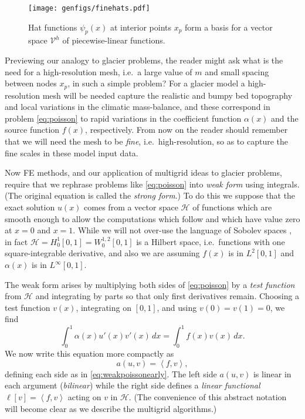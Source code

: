 \documentclass[letterpaper,final,12pt,reqno]{amsart}
\theoremstyle{claim}
\newcommand{\ip}[2]{\left<#1,#2\right>}
\numberwithin{equation}{section}
\numberwithin{figure}{section}
\numberwithin{table}{section}
\numberwithin{theorem}{section}
\begin{document}
\begin{figure}
\texttt{[image: genfigs/finehats.pdf]}
\caption{Hat functions $\psi_p(x)$ at interior points $x_p$ form a basis for a vector space $\mathcal{V}^h$ of piecewise-linear functions.}
\label{fig:finehats}
\end{figure}

Previewing our analogy to glacier problems, the reader might ask what is the need for a high-resolution mesh, i.e.~a large value of $m$ and small spacing between nodes $x_p$, in such a simple problem?  For a glacier model a high-resolution mesh will be needed capture the realistic and bumpy bed topography and local variations in the climatic mass-balance, and these correspond in problem \eqref{eq:poisson} to rapid variations in the coefficient function $\alpha(x)$ and the source function $f(x)$, respectively.  From now on the reader should remember that we will need the mesh to be \emph{fine}, i.e.~high-resolution, so as to capture the fine scales in these model input data.

Now FE methods, and our application of multigrid ideas to glacier problems, require that we rephrase problems like \eqref{eq:poisson} into \emph{weak form} using integrals.  (The original equation is called the \emph{strong form}.)  To do this we suppose that the exact solution $u(x)$ comes from a vector space $\mathcal{H}$ of functions which are smooth enough to allow the computations which follow and which have value zero at $x=0$ and $x=1$.  While we will not over-use the language of Sobolev spaces \cite[for example]{Evans2010}, in fact $\mathcal{H}=H_0^1[0,1]=W_0^{1,2}[0,1]$ is a Hilbert space, i.e.~functions with one square-integrable derivative, and also we are assuming $f(x)$ is in $L^2[0,1]$ and $\alpha(x)$ is in $L^\infty[0,1]$.

The weak form arises by multiplying both sides of \eqref{eq:poisson} by a \emph{test function} from $\mathcal{H}$ and integrating by parts so that only first derivatives remain.  Choosing a test function $v(x)$, integrating on $[0,1]$, and using $v(0)=v(1)=0$, we find
\begin{equation}
\int_0^1 \alpha(x) u'(x) v'(x)\,dx = \int_0^1 f(x) v(x)\, dx.  \label{eq:weakpoissonearly}
\end{equation}
We now write this equation more compactly as
\begin{equation}
  a(u,v) = \ip{f}{v}, \label{eq:weakpoisson}
\end{equation}
defining each side as in \eqref{eq:weakpoissonearly}.  The left side $a(u,v)$ is linear in each argument (\emph{bilinear}) while the right side defines a \emph{linear functional} $\ell[v] = \ip{f}{v}$ acting on $v$ in $\mathcal{H}$.  (The convenience of this abstract notation will become clear as we describe the multigrid algorithms.)
\end{document}
